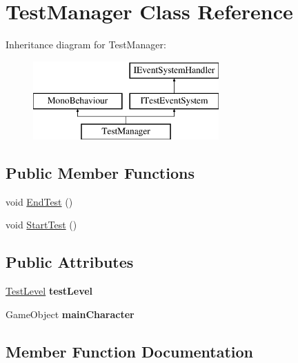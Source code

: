 \hypertarget{class_test_manager}{}\section{Test\+Manager Class Reference}
\label{class_test_manager}
Inheritance diagram for Test\+Manager\+:\begin{figure}[H]
\begin{center}
\leavevmode
\includegraphics[height=3.000000cm]{class_test_manager}
\end{center}
\end{figure}
\subsection*{Public Member Functions}
\begin{DoxyCompactItemize}
\item 
void \mbox{\hyperlink{class_test_manager_a39a04c0d50c7be1322ad25e67696e549}{End\+Test}} ()
\item 
void \mbox{\hyperlink{class_test_manager_a74fe528d0e18c4cca484bca002dc4f2b}{Start\+Test}} ()
\end{DoxyCompactItemize}
\subsection*{Public Attributes}
\begin{DoxyCompactItemize}
\item 
\mbox{\label{class_test_manager_a646d6f59306b6a25f01e8932631141f0}} 
\mbox{\hyperlink{class_test_level}{Test\+Level}} {\bfseries test\+Level}
\item 
\mbox{\label{class_test_manager_ab9a370ea797c52da429e8977799d39cb}} 
Game\+Object {\bfseries main\+Character}
\end{DoxyCompactItemize}


\subsection{Member Function Documentation}
\mbox{\label{class_test_manager_a39a04c0d50c7be1322ad25e67696e549}} 
